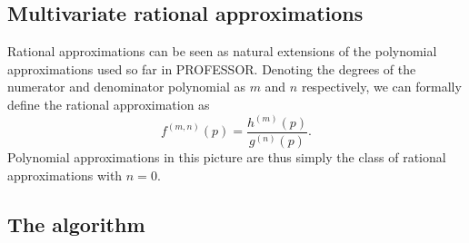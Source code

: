 
\subsection{Multivariate rational approximations}
\label{sec-rapp}

Rational approximations can be seen as natural extensions of the polynomial
approximations used so far in PROFESSOR. Denoting the degrees of the numerator 
and denominator polynomial as $m$ and $n$ respectively, we can formally define
the rational approximation as
\begin{equation}\label{eq:rappdef}
    f^{(m,n)}(p) = \frac{h^{(m)}(p)}{g^{(n)}(p)}.
\end{equation}
Polynomial approximations in this picture are thus simply the class of rational approximations with $n=0$.

\subsection{The algorithm}

